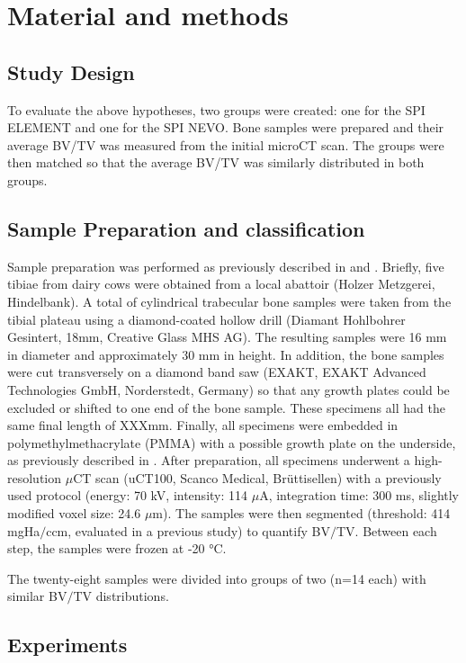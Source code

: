 \documentclass[12pt, a4paper, twoside]{report}
\begin{document}
%
%
%
\chapter{Material and methods}
%
%
%
\section{Study Design}
%
To evaluate the above hypotheses, two groups were created: one for the SPI ELEMENT and one for the SPI NEVO.
Bone samples were prepared and their average BV/TV was measured from the initial microCT scan.
The groups were then matched so that the average BV/TV was similarly distributed in both groups.
%
%
\section{Sample Preparation and classification}
%
Sample preparation was performed as previously described in \citet{wili_experimental_2021} and \citet{voumard_peroperative_2019}.
Briefly, five tibiae from dairy cows were obtained from a local abattoir (Holzer Metzgerei, Hindelbank).
A total of cylindrical trabecular bone samples were taken from the tibial plateau using a diamond-coated hollow drill (Diamant Hohlbohrer Gesintert, 18mm, Creative Glass MHS AG).
The resulting samples were 16 mm in diameter and approximately 30 mm in height.
In addition, the bone samples were cut transversely on a diamond band saw (EXAKT, EXAKT Advanced Technologies GmbH, Norderstedt, Germany) so that any growth plates could be excluded or shifted to one end of the bone sample.
These specimens all had the same final length of XXXmm.
Finally, all specimens were embedded in polymethylmethacrylate (PMMA) with a possible growth plate on the underside, as previously described in \cite{Voumard2015}.
After preparation, all specimens underwent a high-resolution $\mu$CT scan (uCT100, Scanco Medical, Br\"{u}ttisellen) with a previously used protocol (energy: 70 kV, intensity: 114 $\mu$A, integration time: 300 ms, slightly modified voxel size: 24.6 $\mu$m).
The samples were then segmented (threshold: 414 mgHa$/$ccm, evaluated in a previous study) to quantify BV$/$TV.
Between each step, the samples were frozen at -20 °C.

The twenty-eight samples were divided into groups of two (n=14 each) with similar BV$/$TV distributions.
%
\section{Experiments}
%
%
\end{document}
